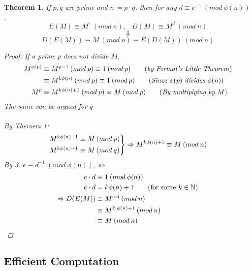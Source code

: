 \documentclass{article}
\newtheorem{theorem}{Theorem}
\begin{document}
\begin{theorem}
    If $p, q$ are prime and $n \coloneqq p \cdot q$, then for any $d \equiv e^{-1} \: (mod \: \phi(n))$.
    \[ E(M) \equiv M^e \: (mod \: n),\;\;\; D(M) \equiv M^d \: (mod \: n)
    \]
    \[ \Downarrow \]
    \[  D(E(M)) \equiv M \: (mod \: n) \equiv E(D(M)) \: (mod \: n)
    \]
    \begin{proof}
        If a prime $p$ does not divide $M$,
        \begin{align*}
            M^ {\phi(p)} & \equiv M^ {p-1} \: (mod \: p) \equiv 1 \: (mod \: p) \tag{\emph{by Fermat's Little Theorem}}             \\
                         & \equiv M^{k \phi(n)} \: (mod \: p) \equiv 1 \: (mod \: p) \tag{\emph{Since $\phi(p)$ divides $\phi(n)$}} \\
            M^{p}        & \equiv M ^{k \phi(n) + 1}\: (mod \: p) \equiv M \: (mod \: p) \tag{\emph{By multiplying by $M$}}
        \end{align*}
        The same can be argued for $q$ \\\\
        By Theroem 1: \\
        \[
            \begin{rcases*}
                M^{k \phi(n) + 1} \equiv M \: (mod \: p) \\
                M^{k \phi(n) + 1} \equiv M \: (mod \: q)
            \end{rcases*}
            \Rightarrow
            M^{k \phi (n) + 1} \equiv M \: (mod \: n)
        \]
        By 3. $e \equiv d ^{-1} \: (mod \: \phi(n))$, so
        \begin{align*}
            e \cdot d           & \equiv 1 \: (mod \: \phi(n))                      \\
            e \cdot d           & = k \phi(n) + 1 \tag{for some $k \in \mathbb{N}$} \\
            \Rightarrow D(E(M)) & \equiv M ^ {e \cdot d} \: (mod \: n)              \\
                                & \equiv M^{k \cdot \phi(n) + 1} \: (mod \: n)      \\
                                & \equiv M \: (mod \: n)
        \end{align*}
    \end{proof}
\end{theorem}
\newpage
\subsection{Efficient Computation}
\end{document}
